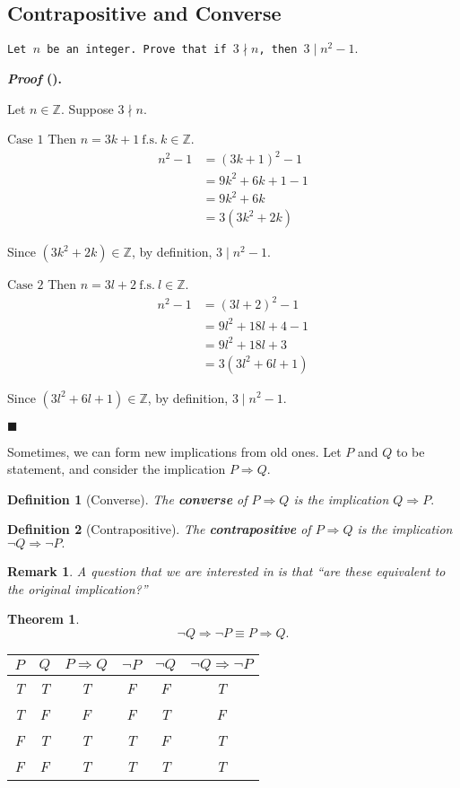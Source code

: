 \documentclass[12pt,a4paper]{article}
\newcounter{nprf}[subsection]
\newtheorem{thm}{Theorem}[subsection]
\newtheorem{df}{Definition}[subsection]
\newtheorem*{rmk}{\indent Remark}
\newenvironment*{prf}{\par\indent\textbf{\textit{Proof} (\stepcounter{nprf}\thenprf). }\par}{\par\hfill $\blacksquare$\par}
\def\Z{{\mathbb{Z}}}
\def\fs{\ \mathrm{f.s.}\ }
\begin{document}
\subsection{Contrapositive and Converse}
\begin{framed}
\noindent\texttt{Let $n$ be an integer. Prove that if $3\nmid n$, then $3\mid n^2-1.$}
\begin{prf}
	Let $n\in\Z$. Suppose $3\nmid n$.\par
	$\boxed{\text{Case }1}$ Then $n=3k+1\fs k\in\Z.$\[\begin{aligned}
		n^2-1&=(3k+1)^2-1\\&=9k^2+6k+1-1\\&=9k^2+6k\\&=3(3k^2+2k)
	\end{aligned}\]\par Since $(3k^2+2k)\in\Z$, by definition, $3\mid n^2-1.$\par 
	$\boxed{\text{Case }2}$ Then $n=3l+2\fs l\in\Z.$\[\begin{aligned}
		n^2-1&=(3l+2)^2-1\\&=9l^2+18l+4-1\\&=9l^2+18l+3\\&=3(3l^2+6l+1)
	\end{aligned}\]\par Since $(3l^2+6l+1)\in\Z$, by definition, $3\mid n^2-1.$
\end{prf}
\end{framed}
Sometimes, we can form new implications from old ones. Let $P$ and $Q$ to be statement, and consider the implication $P\Rightarrow Q.$
\begin{df}[Converse]
	The \textbf{converse} of $P\Rightarrow Q$ is the implication $Q\Rightarrow P.$	
\end{df}
\begin{df}[Contrapositive]
	The \textbf{contrapositive} of $P\Rightarrow Q$ is the implication $\neg Q\Rightarrow\neg P.$	
\end{df}
\begin{rmk} A question that we are interested in is that ``are these equivalent to the original implication?''\end{rmk}
\begin{thm}
	\[\neg Q\Rightarrow\neg P\equiv P\Rightarrow Q.\]
	\begin{center}\begin{tabular}{c|c|c|c|c|c}
		$P$&$Q$&$P\Rightarrow Q$&$\neg P$&$\neg Q$&$\neg Q\Rightarrow\neg P$\\
		\hline
		T&T&T&F&F&T\\
		T&F&F&F&T&F\\
		F&T&T&T&F&T\\
		F&F&T&T&T&T
	\end{tabular}\end{center}
\end{thm}
\end{document}
